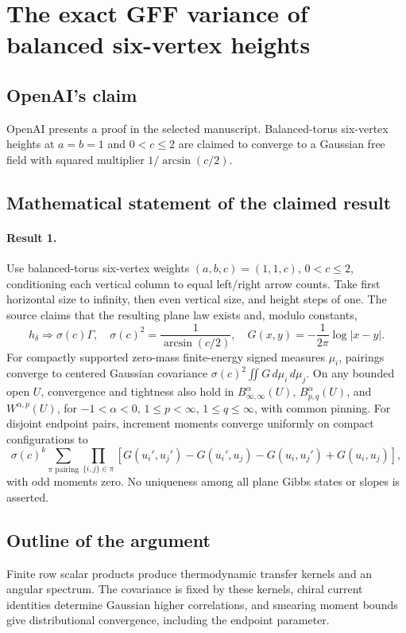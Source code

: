 \documentclass[11pt]{article}
\begin{document}
\section*{The exact GFF variance of balanced six-vertex heights}

\subsection{OpenAI's claim}
OpenAI presents a proof in the selected manuscript. Balanced-torus six-vertex heights at $a=b=1$ and $0<c\leq2$ are claimed to converge to a Gaussian free field with squared multiplier $1/\arcsin(c/2)$.

\subsection{Mathematical statement of the claimed result}
\paragraph{Result 1.} Use balanced-torus six-vertex weights \((a,b,c)=(1,1,c)\), \(0<c\le2\), conditioning each vertical column to equal left/right arrow counts. Take first horizontal size to infinity, then even vertical size, and height steps of one. The source claims that the resulting plane law exists and, modulo constants,
\[
 h_\delta\Longrightarrow\sigma(c)\Gamma,\quad
 \sigma(c)^2=\frac1{\arcsin(c/2)},\quad
 G(x,y)=-\frac1{2\pi}\log|x-y|.
\]
For compactly supported zero-mass finite-energy signed measures \(\mu_i\), pairings converge to centered Gaussian covariance \(\sigma(c)^2\iint G\,d\mu_i\,d\mu_j\). On any bounded open \(U\), convergence and tightness also hold in \(B^\alpha_{\infty,\infty}(U)\), \(B^\alpha_{p,q}(U)\), and \(W^{\alpha,p}(U)\), for \(-1<\alpha<0\), \(1\le p<\infty\), \(1\le q\le\infty\), with common pinning. For disjoint endpoint pairs, increment moments converge uniformly on compact configurations to
\[
 \sigma(c)^k\sum_{\pi\text{ pairing}}\prod_{\{i,j\}\in\pi}
 [G(u_i',u_j')-G(u_i',u_j)-G(u_i,u_j')+G(u_i,u_j)],
\]
with odd moments zero. No uniqueness among all plane Gibbs states or slopes is asserted.

\subsection{Outline of the argument}
Finite row scalar products produce thermodynamic transfer kernels and an angular spectrum. The covariance is fixed by these kernels, chiral current identities determine Gaussian higher correlations, and smearing moment bounds give distributional convergence, including the endpoint parameter.
\end{document}
